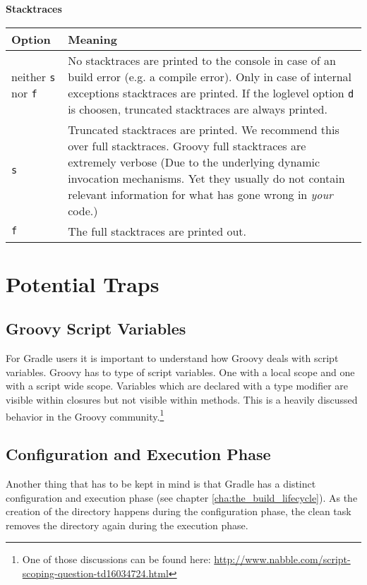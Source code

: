 \centerline{\textbf{Stacktraces}}
\medskip

\begin{tabular}{|l|p{15cm}|} \hline
Option & Meaning  \\ \hline
neither \texttt{s} nor \texttt{f} & No stacktraces are printed to the console in case of an build error (e.g. a compile error). Only in case of internal exceptions stacktraces are printed. If the loglevel option \texttt{d} is choosen, truncated stacktraces are always printed. \\ \hline
\texttt{s} & Truncated stacktraces are printed. We recommend this over full stacktraces. Groovy full stacktraces are extremely verbose (Due to the underlying dynamic invocation mechanisms. Yet they usually do not contain relevant information for what has gone wrong in \emph{your} code.)  \\ \hline
\texttt{f} & The full stacktraces are printed out. \\ \hline
\end{tabular}

\section{Potential Traps}
\subsection{Groovy Script Variables} %
\label{sub:groovy_script_variables}
For Gradle users it is important to understand how Groovy deals with script variables. Groovy has to type of script variables. One with a local scope and one with a script wide scope.
Variables which are declared with a type modifier are visible within closures but not visible within methods. This is a heavily discussed behavior in the Groovy community.\footnote{One of those discussions can be found here: \url{http://www.nabble.com/script-scoping-question-td16034724.html}}

\subsection{Configuration and Execution Phase} %
\label{sub:configuration_and_execution_phase}
Another thing that has to be kept in mind is that Gradle has a distinct configuration and execution phase (see chapter \ref{cha:the_build_lifecycle}). 
As the creation of the directory happens during the configuration phase, the clean task removes the directory again during the execution phase. 

